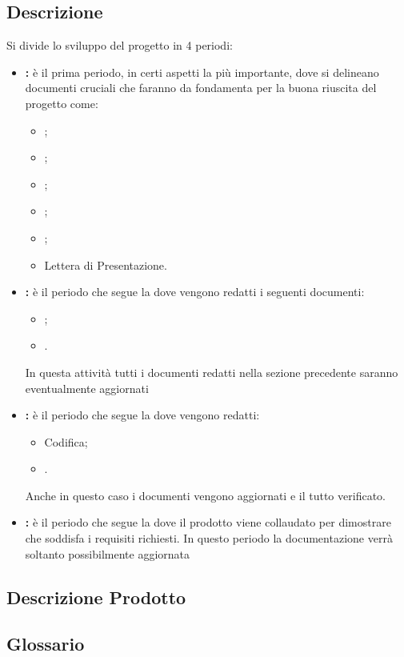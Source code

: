 \documentclass[12pt,a4paper]{article}
\begin{document}
\subsection{Descrizione}

Si divide lo sviluppo del progetto in 4 periodi:
\begin{itemize}
	\item \textbf{\FA{}:} è il prima periodo, in certi aspetti la più importante, dove si delineano documenti cruciali che faranno da fondamenta per la buona riuscita del progetto come:
	\begin{itemize}
		\item \NdP{};
		\item \SdF{};
		\item \AdR{};
		\item \PdP{};
		\item \PdQ{};
		\item Lettera di Presentazione.
	\end{itemize}
	\item \textbf{\FPA{}:} è il periodo che segue la \RR{} dove vengono redatti i seguenti documenti:
	\begin{itemize}
		\item \ST{};
        \item \DP{}.
	\end{itemize} 
	In questa attività tutti i documenti redatti nella sezione precedente saranno eventualmente aggiornati
	\item \textbf{\FPDC{}:} è il periodo che segue la \RP{} dove vengono redatti:
	\begin{itemize}
		\item Codifica;
		\item \MU{}.
	\end{itemize}
	Anche in questo caso i documenti vengono aggiornati e il tutto verificato.
	\item \textbf{\FVV{}:} è il periodo che segue la \RQ{} dove il prodotto viene collaudato per dimostrare che soddisfa i requisiti richiesti. In questo periodo la documentazione verrà soltanto possibilmente aggiornata
\end{itemize}

\subsection{Descrizione Prodotto}
\descrizioneProdotto

\subsection{Glossario}\label{glossario}
\glossarioPrint
\end{document}
